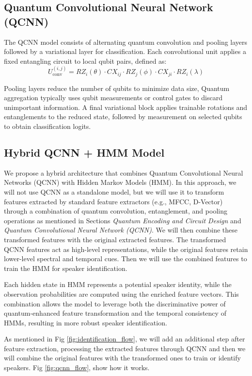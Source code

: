 \documentclass[conference]{IEEEtran}
\begin{document}
\subsection{Quantum Convolutional Neural Network (QCNN)}

The QCNN model consists of alternating quantum convolution and pooling layers followed by a variational layer for classification. Each convolutional unit applies a fixed entangling circuit to local qubit pairs, defined as:
\[
    U^{(i,j)}_{\text{conv}} = RZ_i(\theta) \cdot CX_{ij} \cdot RZ_j(\phi) \cdot CX_{ji} \cdot RZ_i(\lambda)
\]

Pooling layers reduce the number of qubits to minimize data size, Quantum aggregation typically uses qubit measurements or control gates to discard unimportant information. A final variational block applies trainable rotations and entanglements to the reduced state, followed by measurement on selected qubits to obtain classification logits.

\subsection{Hybrid QCNN + HMM Model}

We propose a hybrid architecture that combines Quantum Convolutional Neural Networks (QCNN) with Hidden Markov Models (HMM). In this approach, we will not use QCNN as a standalone model, but we will use it to transform features extracted by standard feature extractors (e.g., MFCC, D-Vector) through a combination of quantum convolution, entanglement, and pooling operations as mentioned in Sections \textit{Quantum Encoding and Circuit Design} and \textit{Quantum Convolutional Neural Network (QCNN)}. We will then combine these transformed features with the original extracted features. The transformed QCNN features act as high-level representations, while the original features retain lower-level spectral and temporal cues. Then we will use the combined features to train the HMM for speaker identification.

Each hidden state in HMM represents a potential speaker identity, while the observation probabilities are computed using the enriched feature vectors. This combination allows the model to leverage both the discriminative power of quantum-enhanced feature transformation and the temporal consistency of HMMs, resulting in more robust speaker identification.

As mentioned in Fig \ref{fig:identification_flow}, we will add an additional step after feature extraction, processing the extracted features through QCNN and then we will combine the original features with the transformed ones to train or identify speakers. Fig \ref{fig:qcnn_flow}, show how it works.
\end{document}
